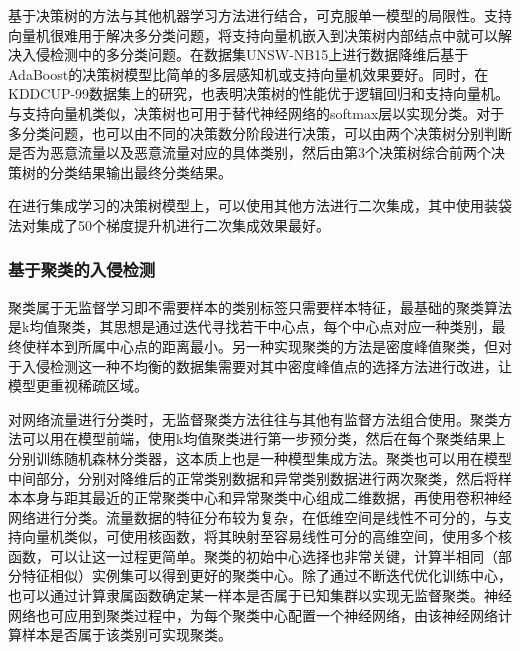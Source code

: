 基于决策树的方法与其他机器学习方法进行结合，可克服单一模型的局限性。支持向量机很难用于解决多分类问题，将支持向量机嵌入到决策树内部结点中就可以解决入侵检测中的多分类问题\cite{10.1109/ACCESS.2023.3251354}。在数据集UNSW-NB15\cite{10.1109/MilCIS.2015.7348942}上进行数据降维后基于AdaBoost的决策树模型比简单的多层感知机或支持向量机效果要好\cite{10.3390/math10030530}。同时，在KDDCUP-99数据集上的研究，也表明决策树的性能优于逻辑回归和支持向量机\cite{10.1155/2021/6634811}。与支持向量机类似，决策树也可用于替代神经网络的softmax层以实现分类\cite{PMID:38339756}。对于多分类问题，也可以由不同的决策数分阶段进行决策，可以由两个决策树分别判断是否为恶意流量以及恶意流量对应的具体类别，然后由第3个决策树综合前两个决策树的分类结果输出最终分类结果\cite{10.3390/fi12030044}。

在进行集成学习的决策树模型上，可以使用其他方法进行二次集成，其中使用装袋法对集成了50个梯度提升机进行二次集成效果最好\cite{10.1016/j.eswa.2022.119030}。
\subsubsection{基于聚类的入侵检测}
聚类属于无监督学习即不需要样本的类别标签只需要样本特征，最基础的聚类算法是k均值聚类，其思想是通过迭代寻找若干中心点，每个中心点对应一种类别，最终使样本到所属中心点的距离最小。另一种实现聚类的方法是密度峰值聚类，但对于入侵检测这一种不均衡的数据集需要对其中密度峰值点的选择方法进行改进，让模型更重视稀疏区域\cite{10.1016/j.sysarc.2021.102212}。

对网络流量进行分类时，无监督聚类方法往往与其他有监督方法组合使用。聚类方法可以用在模型前端，使用k均值聚类进行第一步预分类，然后在每个聚类结果上分别训练随机森林分类器，这本质上也是一种模型集成方法\cite{10.1016/j.measen.2022.100612}。聚类也可以用在模型中间部分，分别对降维后的正常类别数据和异常类别数据进行两次聚类，然后将样本本身与距其最近的正常聚类中心和异常聚类中心组成二维数据，再使用卷积神经网络进行分类\cite{10.1016/j.knosys.2021.106798}。流量数据的特征分布较为复杂，在低维空间是线性不可分的，与支持向量机类似，可使用核函数，将其映射至容易线性可分的高维空间，使用多个核函数，可以让这一过程更简单\cite{10.1007/s13042-020-01253-w}。聚类的初始中心选择也非常关键，计算半相同（部分特征相似）实例集可以得到更好的聚类中心\cite{10.1016/j.cose.2020.102062}。除了通过不断迭代优化训练中心，也可以通过计算隶属函数确定某一样本是否属于已知集群以实现无监督聚类\cite{10.1007/s10699-019-09589-5}。神经网络也可应用到聚类过程中，为每个聚类中心配置一个神经网络，由该神经网络计算样本是否属于该类别可实现聚类\cite{10.1109/INFOCOM42981.2021.9488690}。

